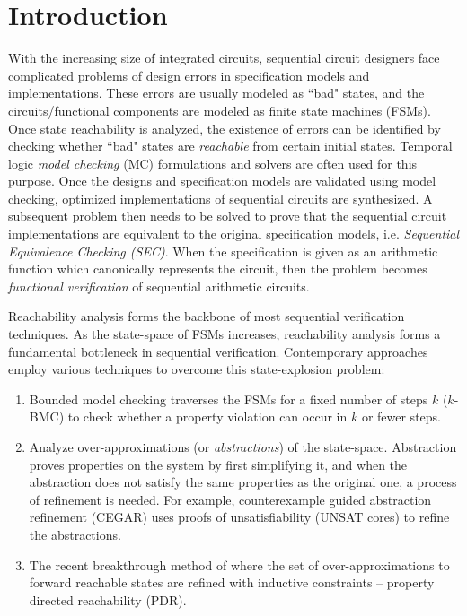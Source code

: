 \chapter{Introduction}
\label{ch:intro}
With the increasing size of integrated
circuits, sequential circuit designers face complicated problems of
design errors in specification models and implementations. These
errors are usually modeled as ``bad" states, and the
circuits/functional components are modeled as finite state machines
(FSMs). Once state reachability is analyzed, the existence of errors
can be identified by checking whether ``bad" states are {\it
  reachable} from certain initial states. Temporal logic {\it model
  checking} (MC) formulations and solvers are often used for this
purpose. Once the designs and specification models are validated using
model checking, optimized implementations of sequential circuits are
synthesized. A subsequent problem then needs to be solved to prove
that the sequential circuit implementations are equivalent to the
original specification models, i.e. {\it Sequential Equivalence
  Checking   (SEC)}. When the specification is given as an arithmetic function
which canonically represents the circuit, then the problem 
becomes {\it functional verification} of sequential arithmetic circuits.

Reachability analysis forms the backbone of most sequential
verification techniques. As the state-space of FSMs increases,
reachability analysis forms a fundamental bottleneck in sequential
verification. Contemporary approaches employ various techniques to
overcome this state-explosion problem: 

\begin{enumerate}[{1)}]
\item Bounded model checking
\cite{bitlevel1} traverses the FSMs for a fixed number of steps $k$
($k$-BMC) to check whether a property violation can occur in $k$ or
fewer steps.  
\item Analyze over-approximations (or {\it abstractions})
of the state-space. Abstraction proves properties on the system by
first simplifying it, and when the abstraction does not satisfy the
same properties as the original one, a process of refinement is
needed. For example, counterexample guided
abstraction refinement (CEGAR) \cite{cegar-journal} uses proofs of
unsatisfiability (UNSAT cores) to refine the abstractions.
\item The recent breakthrough method of \cite{bradley2011sat} where the set of
over-approximations to forward reachable states are refined with
inductive constraints -- property directed reachability (PDR). 
\end{enumerate}


